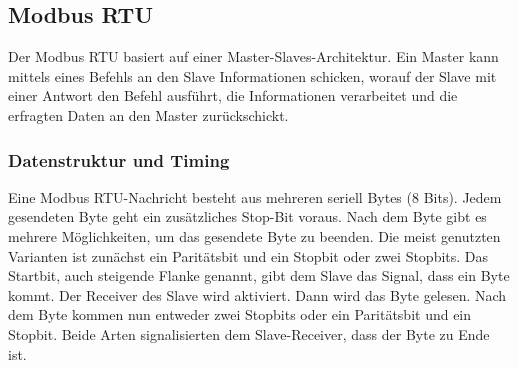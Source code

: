 \newpage 
\subsection{Modbus RTU}
\label{subsec:Modbus-RTU}

Der Modbus RTU basiert auf einer Master-Slaves-Architektur. Ein Master kann mittels eines Befehls an den Slave Informationen schicken, worauf der Slave mit einer Antwort den Befehl ausführt, die Informationen verarbeitet und die erfragten Daten an den Master zurückschickt.


\subsubsection*{Datenstruktur und Timing}

Eine Modbus RTU-Nachricht besteht aus mehreren seriell Bytes (8 Bits). Jedem gesendeten Byte geht ein zusätzliches Stop-Bit voraus. Nach dem Byte gibt es mehrere Möglichkeiten, um das gesendete Byte zu beenden. Die meist genutzten Varianten ist zunächst ein Paritätsbit und ein Stopbit oder zwei Stopbits. 
Das Startbit, auch steigende Flanke genannt,  gibt dem Slave das Signal, dass ein Byte kommt. Der Receiver des Slave wird aktiviert. Dann wird das Byte gelesen. Nach dem Byte kommen nun entweder zwei Stopbits oder ein Paritätsbit und ein Stopbit. Beide Arten signalisierten dem Slave-Receiver, dass der Byte zu Ende ist. 




